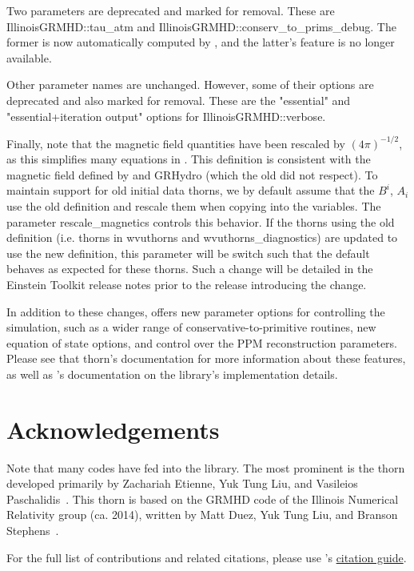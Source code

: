 \documentclass{article}
\begin{document}
Two parameters are deprecated and marked for removal. These are
IllinoisGRMHD::tau\_atm and IllinoisGRMHD::conserv\_to\_prims\_debug. The former
is now automatically computed by \glib, and the latter's feature is no
longer available.

Other \igm{} parameter names are unchanged. However, some of their options
are deprecated and also marked for removal. These are the "essential" and
"essential+iteration output" options for IllinoisGRMHD::verbose.

Finally, note that the magnetic field quantities have been rescaled by
$\left(4\pi\right)^{-1/2}$, as this simplifies many equations in \grhayl.
This definition is consistent with the magnetic field defined by \hydrobase{}
and GRHydro (which the old \igm{} did not respect). To maintain support for
old initial data thorns, we by default assume that the \hydrobase{} $B^i$,
$A_i$ use the old definition and rescale them when copying into the \igm{}
variables. The parameter rescale\_magnetics controls this behavior. If
the thorns using the old definition (i.e. thorns in wvuthorns and
wvuthorns\_diagnostics) are updated to use the new definition, this parameter
will be switch such that the default behaves as expected for these thorns.
Such a change will be detailed in the Einstein Toolkit release notes prior
to the release introducing the change.

In addition to these changes, \glib{} offers new parameter options for
controlling the simulation, such as a wider range of conservative-to-primitive
routines, new equation of state options, and control over the PPM reconstruction
parameters. Please see that thorn's documentation for more information about these
features, as well as \grhayl's documentation on the library's implementation
details.

\section{Acknowledgements}

Note that many codes have fed into the \grhayl{} library. The most prominent is
the \igm{} thorn developed primarily by Zachariah Etienne, Yuk Tung Liu, and
Vasileios Paschalidis~\cite{WVUThorns_IllinoisGRMHD_Etienne:2015cea}. This
thorn is based on the GRMHD code of the Illinois Numerical Relativity group
(ca. 2014), written by Matt Duez, Yuk Tung Liu, and Branson Stephens~.

For the full list of contributions and related citations, please use \grhayl's
\href{https://github.com/GRHayL/GRHayL/wiki/Citation-and-License-Guide}{citation guide}.
\end{document}
